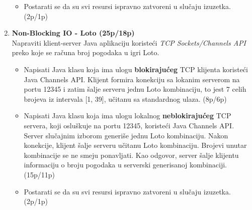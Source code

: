 \documentclass[]{article}
\begin{document}
\begin{enumerate}
\begin{itemize}
  \item Postarati se da su svi resursi ispravno zatvoreni u slu\v{c}aju izuzetka. \hfill (2p/1p)
\end{itemize}%

\vspace{15pt}

\item \textbf{Non-Blocking IO - Loto (25p/18p)}
\\Napraviti klient-server Java aplikaciju koriste\'c{}i \emph{TCP Sockets/Channels API} preko koje se ra\v{c}una broj pogodaka u igri Loto.
\begin{itemize}
    \item Napisati Java klasu koja ima ulogu \textbf{blokiraju\'c{}eg} TCP klijenta koriste\'c{}i Java Channels API. Klijent formira konekciju sa lokanim serverom na portu 12345 i zatim \v{s}alje serveru jednu Loto kombinaciju, to jest 7 celih brojeva iz intervala [1, 39], učitanu sa standardnog ulaza. \hfill (8p/6p)
    \item Napisati Java klasu koja ima ulogu lokalnog \textbf{neblokiraju\'c{}eg} TCP servera, koji oslu\v{s}kuje na portu 12345, koriste\'c{}i Java Channels API. Server slučajnim izborom generiše jednu Loto kombinaciju. Nakon konekcije, klijent \v{s}alje serveru učitanu Loto kombinaciju. Brojevi unutar kombinacije se ne smeju ponavljati. Kao odgovor, server \v{s}alje klijentu informaciju o broju pogodaka u serverski generisanoj kombinaciji. \hfill (15p/11p)
    \item Postarati se da su svi resursi ispravno zatvoreni u slu\v{c}aju izuzetka. \hfill (2p/1p)
  \end{itemize}

\end{enumerate}
\end{document}
